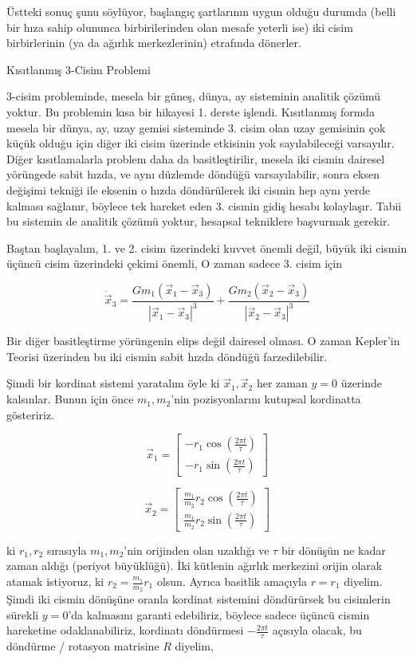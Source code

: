 \documentclass[12pt,fleqn]{article}\usepackage{../../common}
\begin{document}
Üstteki sonuç şunu söylüyor, başlangıç şartlarının uygun olduğu durumda
(belli bir hıza sahip olununca birbirilerinden olan mesafe yeterli ise) iki
cisim birbirlerinin (ya da ağırlık merkezlerinin) etrafında dönerler.

Kısıtlanmış 3-Cisim Problemi

3-cisim probleminde, mesela bir güneş, dünya, ay sisteminin analitik çözümü
yoktur. Bu problemin kısa bir hikayesi 1. derste işlendi. Kısıtlanmış
formda mesela bir dünya, ay, uzay gemisi sisteminde 3. cisim olan uzay
gemisinin çok küçük olduğu için diğer iki cisim üzerinde etkisinin yok
sayılabileceği varsayılır. Diğer kısıtlamalarla problem daha da
basitleştirilir, mesela iki cismin dairesel yörüngede sabit hızda, ve aynı
düzlemde döndüğü varsayılabilir, sonra eksen değişimi tekniği ile eksenin o
hızda döndürülerek iki cismin hep aynı yerde kalması sağlanır, böylece tek
hareket eden 3. cismin gidiş hesabı kolaylaşır. Tabii bu sistemin de
analitik çözümü yoktur, hesapsal tekniklere başvurmak gerekir.

Baştan başlayalım, 1. ve 2. cisim üzerindeki kuvvet önemli değil, büyük iki
cismin üçüncü cisim üzerindeki çekimi önemli, O zaman sadece 3. cisim için

$$ 
\ddot{\vec{x}}_3 =  
\frac{G m_1 (\vec{x}_1-\vec{x}_3)  }{ | \vec{x}_1 - \vec{x}_3|^3  } + 
\frac{G m_2 (\vec{x}_2-\vec{x}_3)  }{ | \vec{x}_2 - \vec{x}_3|^3  } 
$$

Bir diğer basitleştirme yörüngenin elips değil dairesel olması. O zaman
Kepler'in Teorisi üzerinden bu iki cismin sabit hızda döndüğü
farzedilebilir. 

Şimdi bir kordinat sistemi yaratalım öyle ki $\vec{x}_1,\vec{x}_2$ her
zaman $y=0$ üzerinde kalsınlar. Bunun için önce $m_1,m_2$'nin
pozisyonlarını kutupsal kordinatta gösteririz. 

$$ 
\vec{x}_1 = \left[\begin{array}{r}
-r_1 \cos (\frac{2\pi t}{\tau}) \\
-r_1 \sin (\frac{2\pi t}{\tau})
\end{array}\right]
$$

$$ 
\vec{x}_2 = \left[\begin{array}{r}
\frac{m_1}{m_2} r_2 \cos ( \frac{2\pi t}{\tau} )\\
\frac{m_1}{m_2} r_2 \sin ( \frac{2\pi t}{\tau} )
\end{array}\right]
$$

ki $r_1,r_2$ sırasıyla $m_1,m_2$'nin orijinden olan uzaklığı ve $\tau$ bir
dönüşün ne kadar zaman aldığı (periyot büyüklüğü). İki kütlenin ağırlık
merkezini orijin olarak atamak istiyoruz, ki $r_2 = \frac{m_1}{m_2}r_1$
olsun. Ayrıca basitlik amaçıyla $r=r_1$ diyelim. Şimdi iki cismin dönüşüne
oranla kordinat sistemini döndürürsek bu cisimlerin sürekli $y=0$'da
kalmasını garanti edebiliriz, böylece sadece üçüncü cismin hareketine
odaklanabiliriz, kordinatı döndürmesi $-\frac{2\pi t}{\tau}$ açısıyla
olacak, bu döndürme / rotasyon matrisine $R$ diyelim,
\end{document}
